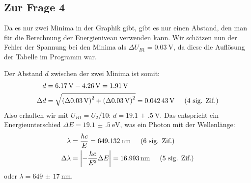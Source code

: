 	\subsection{Zur Frage 4}
		Da es nur zwei Minima in der Graphik gibt, gibt es nur einen Abstand, den man für die Berechnung der Energieniveau verwenden kann. Wir schätzen nun der Fehler der Spannung bei den Minima als $\Delta U_{B1} = \SI{0.03}{\volt}$, da diese die Auflösung der Tabelle im Programm war. 

		Der Abstand $d$ zwischen der zwei Minima ist somit:
		\begin{align}
			d &= \SI{6.17}{\volt} - \SI{4.26}{\volt} = \SI{1.91}{\volt} \\
			\Delta d &= \addquad{\SI{0.03}{\volt}, \SI{0.03}{\volt}} = \SI{0.04243}{\volt} \sigfig{4}
		\end{align}
		Also erhalten wir mit $U_{B1} = U_2 / 10$: $d = \SI{19.1(5)}{\volt}$. Das entspricht ein Energieunterschied $\Delta E = \SI{19.1(5)}{\electronvolt}$, was ein Photon mit der Wellenlänge:
		\begin{align}
			\lambda &= \frac{hc}{E} = \SI{649.132}{\nano\meter} \hspace{0.5cm}\text{(6 sig. Zif.)} \\
			\Delta \lambda &= \abs{-\frac{hc}{E^2}\Delta E} = \SI{16.993}{\nano\meter} \hspace{0.5cm}\text{(5 sig. Zif.)}
		\end{align}
		oder $\lambda = \SI{649(17)}{\nano\meter}$.

